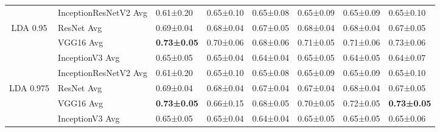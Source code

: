 \begin{landscape}
\begin{table}[]
\begin{tabular}{clllllll}
                            & InceptionResNetV2 Avg              & 0.61±0.20                                  & 0.65±0.10                         & 0.65±0.08                         & 0.65±0.09                         & 0.65±0.09                         & 0.65±0.10                         \\
\multirow{-4}{*}{LDA 0.95}  & ResNet Avg                         & 0.69±0.04                                  & 0.68±0.04                         & 0.67±0.05                         & 0.68±0.04                         & 0.68±0.04                         & 0.67±0.05                         \\
                            & VGG16 Avg                          & \textbf{0.73±0.05}                         & 0.70±0.06                         & 0.68±0.06                         & 0.71±0.05                         & 0.71±0.06                         & 0.73±0.06                         \\
                            & InceptionV3 Avg                    & 0.65±0.05                                  & 0.65±0.04                         & 0.64±0.04                         & 0.65±0.05                         & 0.64±0.05                         & 0.64±0.07                         \\
                            & InceptionResNetV2 Avg              & 0.61±0.20                                  & 0.65±0.10                         & 0.65±0.08                         & 0.65±0.09                         & 0.65±0.09                         & 0.65±0.10                         \\
\multirow{-4}{*}{LDA 0.975} & ResNet Avg                         & 0.69±0.04                                  & 0.68±0.04                         & 0.67±0.04                         & 0.67±0.04                         & 0.68±0.04                         & 0.67±0.05                         \\
                            & VGG16 Avg                          & \textbf{0.73±0.05}                         & 0.66±0.15                         & 0.68±0.05                         & 0.70±0.05                         & 0.72±0.05                         & \textbf{0.73±0.05}                \\
                            & InceptionV3 Avg                    & 0.65±0.05                                  & 0.65±0.04                         & 0.64±0.04                         & 0.65±0.05                         & 0.65±0.05                         & 0.65±0.06                         \\

\end{tabular}
\end{table}
\end{landscape}
